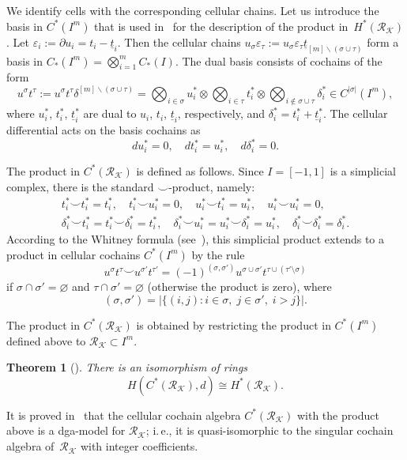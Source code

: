 \documentclass[a4paper,12pt]{amsart}
\newcommand{\K}{\mathcal K}
\newcommand{\R}{\mathcal R}
\newtheorem{theorem}[formula]{Theorem}
\theoremstyle{definition}
\theoremstyle{remark}
\numberwithin{equation}{section}
\begin{document}
We identify cells with the corresponding cellular chains. Let us introduce the basis in $C^*(I^m)$ that is used in~\cite{LiCai} for 
the description of the product in~$H^*(\R_\K)$.
Let $\varepsilon_i := \partial u_i = t_i - \underline{t}_i$. Then the cellular chains $u_\sigma \varepsilon_\tau := u_\sigma \varepsilon_\tau \underline{t}_{[m] \backslash (\sigma \cup \tau)}$
form a basis in $C_*(I^m) = \bigotimes_{i=1}^m C_*(I)$. The dual basis consists of cochains of the form
\[
  u^\sigma t^\tau := u^\sigma t^\tau \delta^{[m] \backslash (\sigma \cup \tau)} = \bigotimes_{i \in \sigma} u_i^* \otimes \bigotimes_{i \in \tau} t_i^*\otimes \bigotimes_{i \notin \sigma \cup \tau} \delta_i^*\in
  C^{|\sigma|}(I^m),
\]  
where $u_i^*$, $t_i^*$, $\underline{t}_i^*$ are dual to $u_i$, $t_i$, $\underline{t}_i$, respectively, and $\delta_i^* = t_i^* + \underline{t}_i^*$.
The cellular differential acts on the basis cochains as
\[
  d u_i^*=0,\quad dt_i^*=u_i^*,\quad d\delta_i^*=0.
\]

The product in $C^*(\R_\K)$ is defined as follows. Since $I = [-1, 1]$ is a simplicial complex, there is the standard $\smile$-product, namely:
\begin{gather*}
  t_i^* \smile t_i^* = t_i^*, \quad t_i^* \smile u_i^* = 0, \quad u_i^* \smile t_i^* = 
  u_i^*, \quad u_i^* \smile u_i^* = 0,\\
  \delta_i^* \smile t_i^* = t_i^* \smile \delta_i^* = t_i^*, \quad \delta_i^* \smile u_i^* = u_i^* \smile \delta_i^* = u_i^*, \quad \delta_i^* \smile \delta_i^* = \delta_i^*.
\end{gather*} 
According to the Whitney formula (see~\cite{Whi}), this simplicial product extends to a product in cellular cochains $C^*(I^m)$ by the rule
\[
  u^\sigma t^\tau \smile u^{\sigma'} t^{\tau'} = (-1)^{(\sigma, \sigma')} u^{\sigma \cup \sigma'} t^{\tau \cup (\tau' \setminus \sigma)}
\]
if $\sigma \cap \sigma' = \varnothing$ and $\tau\cap\sigma'=\varnothing$ (otherwise the product is zero), where
\[
  (\sigma, \sigma') = |\{(i, j) \colon i \in\sigma, \; j \in \sigma', \; i > j \}|.
\]  

The product in $C^*(\R_\K)$ is obtained by restricting the product in $C^*(I^m)$ defined above to $\R_\K\subset I^m$.

\begin{theorem}[{\cite[Theorem~5.1]{LiCai}}]
There is an isomorphism of rings
\[ 
  H(C^*(\R_\K),d)\cong H^*(\R_\K).
\]
\end{theorem}

It is proved in~\cite{franz24} that the cellular cochain algebra $C^*(\R_\K)$ with the product above is a dga-model
for $\R_\K$; i.\,e., it is quasi-isomorphic to the singular cochain algebra of~$\R_\K$ with integer coefficients.
\end{document}
